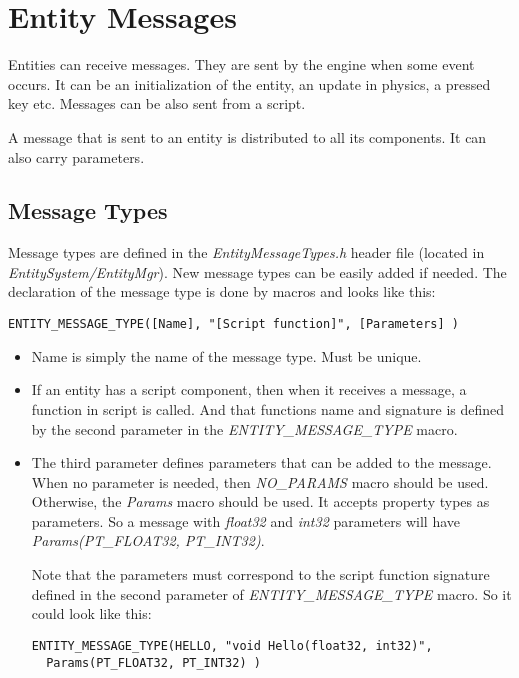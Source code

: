 \documentclass[a4paper, 12pt]{report}
\begin{document}
\section{Entity Messages}

Entities can receive messages. They are sent by the engine when some event occurs. It can be an initialization of the entity, an update in physics, a pressed key etc. Messages can be also sent from a script.

A message that is sent to an entity is distributed to all its components. It can also carry parameters.

\subsection{Message Types}
Message types are defined in the \emph{EntityMessageTypes.h} header file (located in \emph{EntitySystem/EntityMgr}). New message types can be easily added if needed. The declaration of the message type is done by macros and looks like this:

\footnotesize 
\begin{verbatim}
ENTITY_MESSAGE_TYPE([Name], "[Script function]", [Parameters] )
\end{verbatim}
\normalsize

\begin{itemize}
\item
Name is simply the name of the message type. Must be unique.
\item
If an entity has a script component, then when it receives a message, a function in script is called. And that functions name and signature is defined by the second parameter in the \emph{ENTITY\_MESSAGE\_TYPE} macro.
\item
The third parameter defines parameters that can be added to the message. When no parameter is needed, then \emph{NO\_PARAMS} macro should be used. Otherwise, the \emph{Params} macro should be used. It accepts property types as parameters. So a message with  \emph{float32} and  \emph{int32} parameters will have \emph{Params(PT\_FLOAT32, PT\_INT32)}.

Note that the parameters must correspond to the script function signature defined in the second parameter of \emph{ENTITY\_MESSAGE\_TYPE} macro. So it could look like this: 

\footnotesize 
\begin{verbatim}
ENTITY_MESSAGE_TYPE(HELLO, "void Hello(float32, int32)",
  Params(PT_FLOAT32, PT_INT32) )
\end{verbatim}
\normalsize

\end{itemize}
\end{document}
